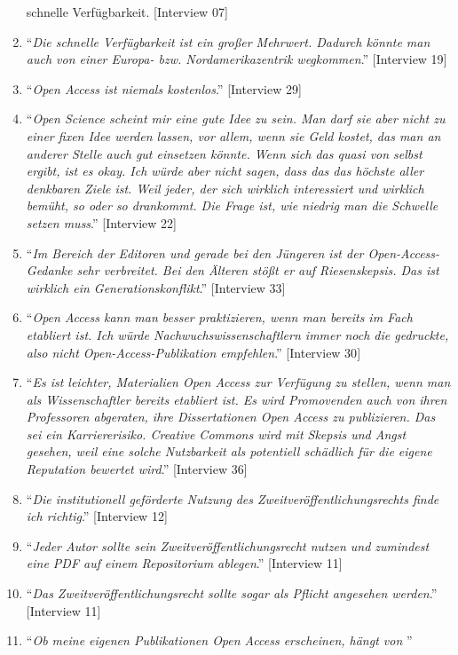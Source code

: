 \documentclass[a4paper,
fontsize=11pt,
oneside,
numbers=noperiodatend,
parskip=half-,
bibliography=totoc,
final
]{scrartcl}
\begin{document}
\begin{enumerate}
{{  schnelle Verfügbarkeit}.} {[}Interview 07{]}
\item
  \enquote{\emph{Die schnelle Verfügbarkeit ist ein großer Mehrwert.
  Dadurch könnte man auch von einer Europa- bzw. Nordamerikazentrik
  wegkommen}.} {[}Interview 19{]}
\item
  \enquote{\emph{Open Access ist niemals kostenlos}.} {[}Interview 29{]}
\item
  \enquote{\emph{Open Science scheint mir eine gute Idee zu sein. Man
  darf sie aber nicht zu einer fixen Idee werden lassen, vor allem, wenn
  sie Geld kostet, das man an anderer Stelle auch gut einsetzen könnte.
  Wenn sich das quasi von selbst ergibt, ist es okay. Ich würde aber
  nicht sagen, dass das das höchste aller denkbaren Ziele ist. Weil
  jeder, der sich wirklich interessiert und wirklich bemüht, so oder so
  drankommt. Die Frage ist, wie niedrig man die Schwelle setzen muss}.}
  {[}Interview 22{]}
\item
  \enquote{\emph{Im Bereich der Editoren und gerade bei den Jüngeren ist
  der Open-Access-Gedanke sehr verbreitet. Bei den Älteren stößt er auf
  Riesenskepsis. Das ist wirklich ein Generationskonflikt}.}
  {[}Interview 33{]}
\item
  \enquote{\emph{Open Access kann man besser praktizieren, wenn man
  bereits im Fach etabliert ist. Ich würde Nachwuchswissenschaftlern
  immer noch die gedruckte, also nicht Open-Access-Publikation
  empfehlen}.} {[}Interview 30{]}
\item
  \enquote{\emph{Es ist leichter, Materialien Open Access zur Verfügung
  zu stellen, wenn man als Wissenschaftler bereits etabliert ist. Es
  wird Promovenden auch von ihren Professoren abgeraten, ihre
  Dissertationen Open Access zu publizieren. Das sei ein Karriererisiko.
  Creative Commons wird mit Skepsis und Angst gesehen, weil eine solche
  Nutzbarkeit als potentiell schädlich für die eigene Reputation
  bewertet wird}.} {[}Interview 36{]}
\item
  \enquote{\emph{Die institutionell geförderte Nutzung des
  Zweitveröffentlichungsrechts finde ich richtig}.} {[}Interview 12{]}
\item
  \enquote{\emph{Jeder Autor sollte sein Zweitveröffentlichungsrecht
  nutzen und zumindest eine PDF auf einem Repositorium ablegen}.}
  {[}Interview 11{]}
\item
  \enquote{\emph{Das Zweitveröffentlichungsrecht sollte sogar als
  Pflicht angesehen werden}.} {[}Interview 11{]}
\item
  \enquote{\emph{Ob meine eigenen Publikationen Open Access erscheinen, hängt von
}}
\end{enumerate}
\end{document}

